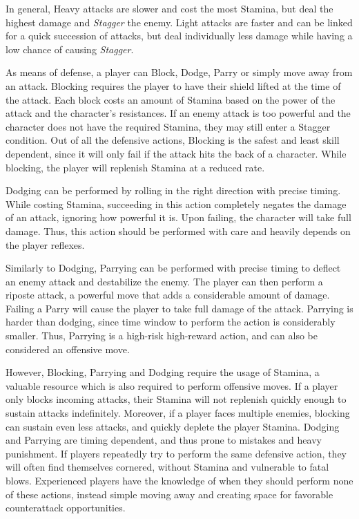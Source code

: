 In general, Heavy attacks are slower and cost the most Stamina, but deal the highest damage and \emph{Stagger} the enemy. Light attacks are faster and can be linked for a quick succession of attacks, but deal individually less damage while having a low chance of causing \emph{Stagger}.

As means of defense, a player can Block, Dodge, Parry or simply move away from an attack. Blocking requires the player to have their shield lifted at the time of the attack. Each block costs an amount of Stamina based on the power of the attack and the character's resistances. If an enemy attack is too powerful and the character does not have the required Stamina, they may still enter a Stagger condition. Out of all the defensive actions, Blocking is the safest and least skill dependent, since it will only fail if the attack hits the back of a character. While blocking, the player will replenish Stamina at a reduced rate.

Dodging can be performed by rolling in the right direction with precise timing. While costing Stamina, succeeding in this action completely negates the damage of an attack, ignoring how powerful it is. Upon failing, the character will take full damage. Thus, this action should be performed with care and heavily depends on the player reflexes.

Similarly to Dodging, Parrying can be performed with precise timing to deflect an enemy attack and destabilize the enemy. The player can then perform a riposte attack, a powerful move that adds a considerable amount of damage. Failing a Parry will cause the player to take full damage of the attack. Parrying is harder than dodging, since time window to perform the action is considerably smaller. Thus, Parrying is a high-risk high-reward action, and can also be considered an offensive move.

However, Blocking, Parrying and Dodging require the usage of Stamina, a valuable resource which is also required to perform offensive moves. If a player only blocks incoming attacks, their Stamina will not replenish quickly enough to sustain attacks indefinitely. Moreover, if a player faces multiple enemies, blocking can sustain even less attacks, and quickly deplete the player Stamina. Dodging and Parrying are timing dependent, and thus prone to mistakes and heavy punishment. If players repeatedly try to perform the same defensive action, they will often find themselves cornered, without Stamina and vulnerable to fatal blows. Experienced players have the knowledge of when they should perform none of these actions, instead simple moving away and creating space for favorable counterattack opportunities.

